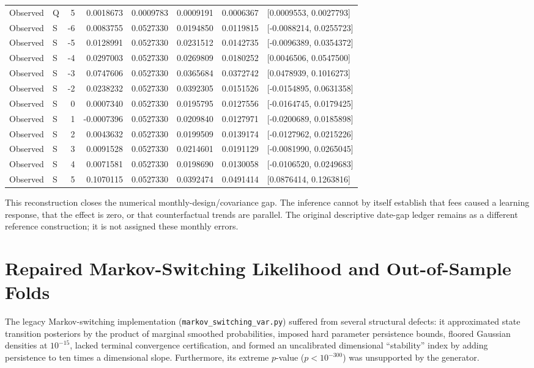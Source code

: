 {\begin{longtable}{llrrrrrl}
Observed & Q & 5 & 0.0018673 & 0.0009783 & 0.0009191 & 0.0006367 & [0.0009553, 0.0027793]\\
Observed & S & -6 & 0.0083755 & 0.0527330 & 0.0194850 & 0.0119815 & [-0.0088214, 0.0255723]\\
Observed & S & -5 & 0.0128991 & 0.0527330 & 0.0231512 & 0.0142735 & [-0.0096389, 0.0354372]\\
Observed & S & -4 & 0.0297003 & 0.0527330 & 0.0269809 & 0.0180252 & [0.0046506, 0.0547500]\\
Observed & S & -3 & 0.0747606 & 0.0527330 & 0.0365684 & 0.0372742 & [0.0478939, 0.1016273]\\
Observed & S & -2 & 0.0238232 & 0.0527330 & 0.0392305 & 0.0151526 & [-0.0154895, 0.0631358]\\
Observed & S & 0 & 0.0007340 & 0.0527330 & 0.0195795 & 0.0127556 & [-0.0164745, 0.0179425]\\
Observed & S & 1 & -0.0007396 & 0.0527330 & 0.0209840 & 0.0127971 & [-0.0200689, 0.0185898]\\
Observed & S & 2 & 0.0043632 & 0.0527330 & 0.0199509 & 0.0139174 & [-0.0127962, 0.0215226]\\
Observed & S & 3 & 0.0091528 & 0.0527330 & 0.0214601 & 0.0191129 & [-0.0081990, 0.0265045]\\
Observed & S & 4 & 0.0071581 & 0.0527330 & 0.0198690 & 0.0130058 & [-0.0106520, 0.0249683]\\
Observed & S & 5 & 0.1070115 & 0.0527330 & 0.0392474 & 0.0491414 & [0.0876414, 0.1263816]\\
\end{longtable}
}
This reconstruction closes the numerical monthly-design/covariance gap. The inference cannot by itself establish that fees caused a learning response, that the effect is zero, or that counterfactual trends are parallel. The original descriptive date-gap ledger remains as a different reference construction; it is not assigned these monthly errors.

\section{Repaired Markov-Switching Likelihood and Out-of-Sample Folds}
\label{sec:regime_repaired}
The legacy Markov-switching implementation (\texttt{markov\_switching\_var.py}) suffered from several structural defects: it approximated state transition posteriors by the product of marginal smoothed probabilities, imposed hard parameter persistence bounds, floored Gaussian densities at $10^{-15}$, lacked terminal convergence certification, and formed an uncalibrated dimensional ``stability'' index by adding persistence to ten times a dimensional slope. Furthermore, its extreme $p$-value ($p < 10^{-300}$) was unsupported by the generator.

